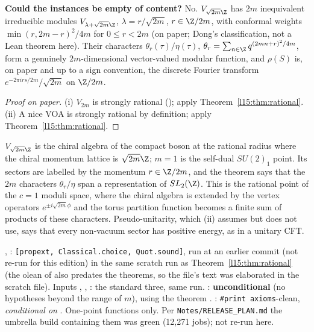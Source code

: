 \begin{dictionary}
\textbf{Could the instances be empty of content?} No. $V_{\sqrt{2m}\Z}$ has $2m$ inequivalent irreducible modules
$V_{\lambda+\sqrt{2m}\Z}$, $\lambda=r/\sqrt{2m}$, $r\in\Z/2m$, with conformal weights $\min(r,2m-r)^2/4m$ for $0\le r<2m$
(on paper; Dong's classification, not a Lean theorem here). Their characters
$\theta_{r}(\tau)/\eta(\tau)$, $\theta_r=\sum_{n\in\Z}q^{(2mn+r)^2/4m}$, form a genuinely $2m$-dimensional vector-valued modular
function, and $\rho(S)$ is, on paper and up to a sign convention, the discrete Fourier transform $e^{-2\pi i rs/2m}/\sqrt{2m}$
on $\Z/2m$.
\end{dictionary}

\begin{proof}[Proof on paper]
(i) $V_{2m}$ is strongly rational (); apply Theorem~\ref{l15:thm:rational}. (ii) A nice VOA is
strongly rational by definition; apply Theorem~\ref{l15:thm:rational}.
\end{proof}

\begin{physics}
$V_{\sqrt{2m}\Z}$ is the chiral algebra of the compact boson at the rational radius where the chiral momentum lattice is
$\sqrt{2m}\Z$; $m=1$ is the self-dual $SU(2)_1$ point. Its sectors are labelled by the momentum $r\in\Z/2m$, and the theorem
says that the $2m$ characters $\theta_r/\eta$ span a representation of $\lfifteenSL$. This is the rational point of the
$c=1$ moduli space, where the chiral algebra is extended by the vertex operators $e^{\pm i\sqrt{2m}\phi}$ and the torus partition
function becomes a finite sum of products of these characters. Pseudo-unitarity, which (ii) assumes but does not use, says
that every non-vacuum sector has positive energy, as in a unitary CFT.
\end{physics}

\begin{status}
\allowbreak{}, \allowbreak{}: \texttt{[propext,
Classical.choice, Quot.sound]}, run at an earlier commit (not re-run for this edition) in the same scratch run as Theorem~\ref{l15:thm:rational} (the olean of
 also predates the theorems, so the file's text was elaborated in the scratch file).
Inputs , , : the standard three, same run.
: \textbf{unconditional} (no hypotheses beyond the range of $m$), using the theorem .
: \texttt{\#print axioms}-clean, \emph{conditional on} . One-point functions only.
Per \texttt{Notes/RELEASE\_PLAN.md} the umbrella build containing them was green (12,271 jobs); not re-run here.
\end{status}

